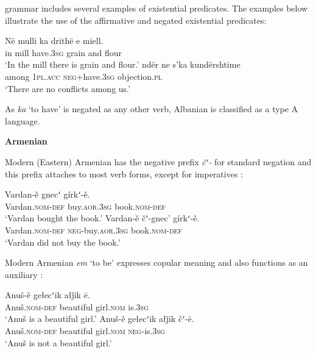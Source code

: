 ﻿\documentclass[output=paper]{langsci/langscibook}
\begin{document}
\begin{unindented}
 grammar includes several examples of existential predicates. The examples below illustrate the use of the affirmative and negated existential predicates:
%
\begin{exe}\ex \gll Në mulli ka drithë e miell. \\
in mill have.\textsc{3sg} grain and flour \\
    \glt `In the mill there is grain and flour.' \parencite[12/257]{Camaj1984}
\ex \gll ndër ne s’ka kundërshtime \\
among \textsc{1pl}.\textsc{acc} \textsc{neg}+have.\textsc{3sg} objection.\textsc{pl} \\
    \glt `There are no conflicts among us.' \citep[70]{Camaj1984}
    \end{exe} 

As \textit{ka} `to have' is negated as any other verb, Albanian is classified as a type A language. 

\textbf{Armenian}

Modern (Eastern) Armenian has the negative prefix \textit{čʻ-} for standard
negation and this prefix attaches to most verb forms, except for
imperatives \parencite[522]{DumTragut2009}:
%
\begin{exe}\ex \gll Vardan-ě gnecʻ gírkʻ-ě.  \\
Vardan.\textsc{nom}-\textsc{def} buy.\textsc{aor}.\textsc{3sg} book.\textsc{nom-def} \\
    \glt `Vardan bought the book.' \parencite[51]{DumTragut2009}
\ex \gll Vardan-ě čʻ-gnec’ gírkʻ-ě.  \\
Vardan.\textsc{nom}-\textsc{def} \textsc{neg}-buy.\textsc{aor}.\textsc{3sg} book.\textsc{nom-def} \\
    \glt `Vardan did not buy the book.' \parencite[51]{DumTragut2009}
    \end{exe} 

Modern Armenian \textit{em} `to be' expresses copular meaning and also
functions as an auxiliary \parencite[215]{DumTragut2009}:

\begin{exe}\ex \gll Anuš-ě gełecʻik   ałǰik ē. \\
Anuš.\textsc{nom}-\textsc{def} beautiful girl.\textsc{nom} is.\textsc{3sg} \\
    \glt `Anuš is a beautiful girl.' \parencite[215]{DumTragut2009}
\ex \gll Anuš-ě gełecʻik ałǰik čʻ-ē.  \\
Anuš.\textsc{nom}-\textsc{def} beautiful girl.\textsc{nom} \textsc{neg}-is.\textsc{3sg} \\
    \glt `Anuš is not a beautiful girl.' \parencite[215]{DumTragut2009}
    \end{exe}


\end{unindented}
\end{document}
